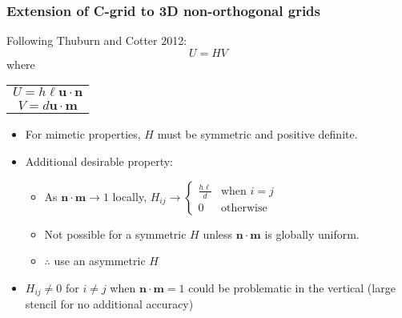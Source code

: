 \begin{frame}
\frametitle{Extension of C-grid to 3D non-orthogonal grids}

\begin{minipage}[c]{0.6\columnwidth}%
Following Thuburn and Cotter 2012:
\[
U=HV
\]
where
\begin{tabular}{c}
$U=h\ell\mathbf{u}\cdot\mathbf{n}$\tabularnewline
$V=d\mathbf{u}\cdot\mathbf{m}$\tabularnewline
\end{tabular}%
\end{minipage}\textbf{\hfill{}}%
\begin{minipage}[c]{0.38\columnwidth}%
%
\end{minipage}
\pause
\begin{itemize}[<+->]
\item For mimetic properties, $H$ must be symmetric and positive definite. 
\item Additional desirable property:
\begin{itemize}
\item As $\mathbf{n}\cdot\mathbf{m}\rightarrow1$ locally, $H_{ij}\rightarrow\begin{cases}
\frac{h\ell}{d} & \text{when }i=j\\
0 & \text{otherwise }
\end{cases}$
\item Not possible for a symmetric $H$ unless $\mathbf{n}\cdot\mathbf{m}$
is globally uniform.
\item $\therefore$ use an asymmetric $H$
\end{itemize}
\item $H_{ij}\ne0$ for $i\ne j$ when $\mathbf{n}\cdot\mathbf{m}=1$ could
be problematic in the vertical (large stencil for no additional accuracy)
\end{itemize}
\end{frame}

